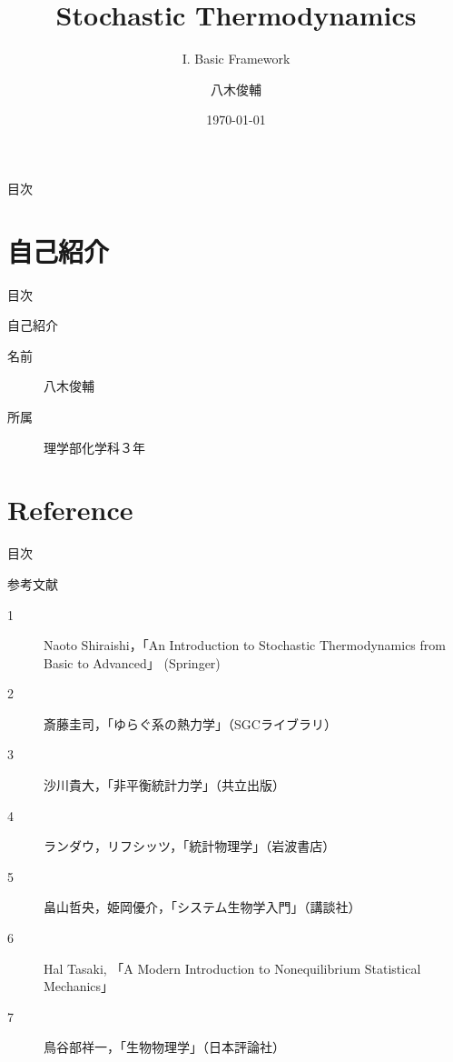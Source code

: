 \documentclass[aspectratio=169, dvipdfmx, 11pt,uplatex]{beamer} %
\title[Stochastic Thermodynamics]{Stochastic Thermodynamics}
\subtitle{I. Basic Framework}
\author[八木俊輔]{八木俊輔}
\date{\today}
\begin{document}
\maketitle

\begin{frame}{目次}
    \tableofcontents
\end{frame}

\section{自己紹介}
\begin{frame}{目次}
  \tableofcontents[currentsection]
\end{frame}

\begin{frame}{自己紹介}
  \begin{description}
    \item[名前] 八木俊輔
    \item[所属] 理学部化学科３年
  \end{description}
\end{frame}

\section{Reference}

\begin{frame}{目次}
  \tableofcontents[currentsection]
\end{frame}

\begin{frame}{参考文献}
  \begin{description}
    \item[1] Naoto Shiraishi，「An Introduction to Stochastic Thermodynamics from Basic to Advanced」 (Springer)
    \item[2] 斎藤圭司，「ゆらぐ系の熱力学」（SGCライブラリ）
    \item[3] 沙川貴大，「非平衡統計力学」（共立出版）
    \item[4] ランダウ，リフシッツ，「統計物理学」（岩波書店）
    \item[5] 畠山哲央，姫岡優介，「システム生物学入門」（講談社）
    \item[6] Hal Tasaki, 「A Modern Introduction to Nonequilibrium Statistical Mechanics」
    \item[7] 鳥谷部祥一，「生物物理学」（日本評論社）
  \end{description}
\end{frame}
\end{document}
